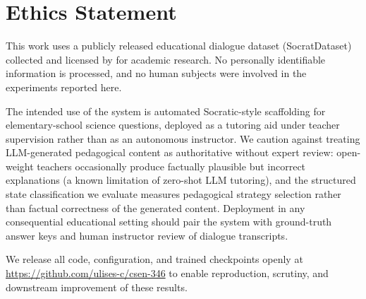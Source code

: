 \documentclass[11pt]{article}
\begin{document}
\section*{Ethics Statement}

This work uses a publicly released educational dialogue dataset (SocratDataset) collected and licensed by \citet{peng2025kele} for academic research. No personally identifiable information is processed, and no human subjects were involved in the experiments reported here.

The intended use of the system is automated Socratic-style scaffolding for elementary-school science questions, deployed as a tutoring aid under teacher supervision rather than as an autonomous instructor. We caution against treating LLM-generated pedagogical content as authoritative without expert review: open-weight teachers occasionally produce factually plausible but incorrect explanations (a known limitation of zero-shot LLM tutoring), and the structured state classification we evaluate measures pedagogical strategy selection rather than factual correctness of the generated content. Deployment in any consequential educational setting should pair the system with ground-truth answer keys and human instructor review of dialogue transcripts.

We release all code, configuration, and trained checkpoints openly at \url{https://github.com/ulises-c/csen-346} to enable reproduction, scrutiny, and downstream improvement of these results.


\end{document}
